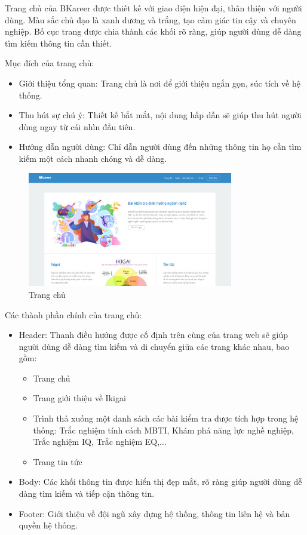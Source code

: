 Trang chủ của BKareer được thiết kế với giao diện hiện đại, thân thiện với người dùng. Màu sắc chủ đạo là xanh dương và trắng, tạo cảm giác tin cậy và chuyên nghiệp. Bố cục trang được chia thành các khối rõ ràng, giúp người dùng dễ dàng tìm kiếm thông tin cần thiết.

Mục đích của trang chủ:
\begin{itemize}
    \item Giới thiệu tổng quan: Trang chủ là nơi để giới thiệu ngắn gọn, súc tích về hệ thống.
    \item Thu hút sự chú ý: Thiết kế bắt mắt, nội dung hấp dẫn sẽ giúp thu hút người dùng ngay từ cái nhìn đầu tiên.
    \item Hướng dẫn người dùng: Chỉ dẫn người dùng đến những thông tin họ cần tìm kiếm một cách nhanh chóng và dễ dàng.
\end{itemize}

\begin{figure}[H]
    \centering
    \includegraphics[width=0.8\textwidth]
    {images/chap5/homeScreen.png}
    \vspace{0.5cm}
    \caption{Trang chủ}
\end{figure}

Các thành phần chính của trang chủ:
\begin{itemize}
    \item Header: Thanh điều hướng được cố định trên cùng của trang web sẽ giúp người dùng dễ dàng tìm kiếm và di chuyển giữa các trang khác nhau, bao gồm:
        \begin{itemize}
            \item Trang chủ
            \item Trang giới thiệu về Ikigai
            \item Trình thả xuống một danh sách các bài kiểm tra được tích hợp trong hệ thống: Trắc nghiệm tính cách MBTI, Khám phá năng lực nghề nghiệp, Trắc nghiệm IQ, Trắc nghiệm EQ,...
            \item Trang tin tức
        \end{itemize}
    \item Body: Các khối thông tin được hiển thị đẹp mắt, rõ ràng giúp người dùng dễ dàng tìm kiếm và tiếp cận thông tin.
    \item Footer: Giới thiệu về đội ngũ xây dựng hệ thống, thông tin liên hệ và bản quyền hệ thống.
\end{itemize}


